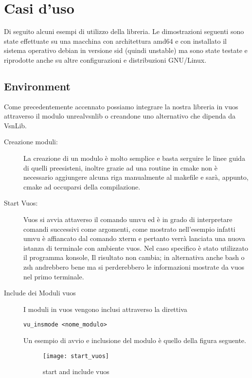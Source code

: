 

\chapter{Casi d'uso}                %
\lhead[\fancyplain{}{\bfseries\thepage}]{\fancyplain{}{\bfseries\rightmark}}
Di seguito alcuni esempi di utilizzo della libreria.
Le dimostrazioni seguenti sono state effettuate su una macchina con architettura amd64 e con installato il sistema operativo debian in versione sid (quindi unstable) ma sono state testate e riprodotte anche su altre configurazioni e distribuzioni GNU/Linux.
\section{Environment}
Come precedentemente accennato possiamo integrare la nostra libreria in vuos attraverso il modulo unrealvsnlib o creandone uno alternativo che dipenda da VsnLib.\\
\begin{description}
\item[Creazione moduli:] La creazione di un modulo \`e molto semplice e basta serguire le linee guida di quelli preesisteni, inoltre grazie ad una routine in cmake non \`e necessario aggiungere alcuna riga manualmente al makefile e sar\`a, appunto, cmake ad occuparsi della compilazione.
\item[Start Vuos:] Vuos si avvia attaverso il comando umvu ed \`e in grado di interpretare comandi successivi come argomenti, come mostrato nell'esempio infatti umvu \`e affiancato dal comando xterm e pertanto verr\`a lanciata una nuova istanza di terminale con ambiente vuos. Nel caso specifico \`e stato utilizzato il programma konsole, Il risultato non cambia; in alternativa anche bash o zsh andrebbero bene ma si perderebbero le informazioni mostrate da vuos nel primo terminale.
\item[Include dei Moduli vuos] I moduli in vuos vengono inclusi attraverso la direttiva
\begin{verbatim}
vu_insmode <nome_modulo>
\end{verbatim}
Un esempio di avvio e inclusione del modulo \`e quello della figura seguente.
\begin{figure}[h]                       %
\begin{center}                          %
\texttt{[image: start\_vuos]}%
%
\caption[start/include\_mod vuos]{start and include vuos}\label{fig:map}
\end{center}
\end{figure}
\end{description}
